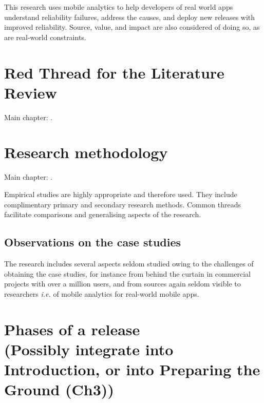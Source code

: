 This research uses mobile analytics to help developers of real world apps understand reliability failures, address the causes, and deploy new releases with improved reliability. %
Source, value, and impact are also considered of doing so, as are real-world constraints. %


\section{Red Thread for the Literature Review}
Main chapter: .


\section[Research methodology]{Research methodology}
Main chapter: . 

Empirical studies are highly appropriate and therefore used. They include complimentary primary and secondary research methods. Common threads facilitate comparisons and generalising aspects of the research. %

\clearpage


\subsection{Observations on the case studies}
The research includes several aspects seldom studied owing to the challenges of obtaining the case studies, for instance from behind the curtain in commercial projects with over a million users, and from sources again seldom visible to researchers \emph{i.e.} of mobile analytics for real-world mobile apps.



\clearpage
\section[Phases of a release]{Phases of a release\\ \small{(Possibly integrate into Introduction, or into Preparing the Ground (Ch3))}}


